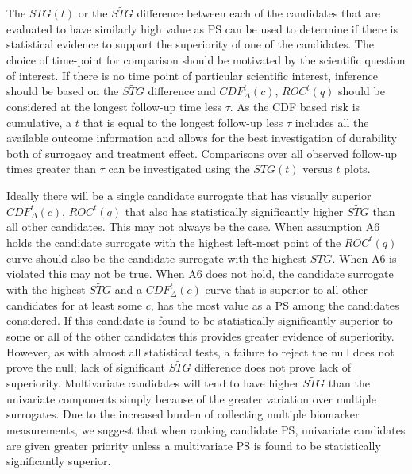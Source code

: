 \documentclass[times, doublespace]{simauth}
\begin{document}
The $STG(t)$ or the $\widetilde{STG}$ difference between each of the candidates that are evaluated to have similarly high value as PS can be used to determine if there is statistical evidence to support the superiority of one of the candidates. The choice of time-point for comparison should be motivated by the scientific question of interest. If there is no time point of particular scientific interest, inference should be based on the $\widetilde{STG}$ difference and $CDF^{t}_{\Delta}(c)$, $ROC^{t}(q)$ should be considered at the longest follow-up time less $\tau$. As the CDF based risk is cumulative, a $t$ that is equal to the longest follow-up less $\tau$ includes all the available outcome information and allows for the best investigation of durability both of surrogacy and treatment effect. Comparisons over all observed follow-up times greater than $\tau$ can be investigated using the $STG(t)$ versus $t$ plots.

Ideally there will be a single candidate surrogate that has visually superior $CDF^{t}_{\Delta}(c)$, $ROC^{t}(q)$ that also has statistically significantly higher $\widetilde{STG}$ than all other candidates. This may not always be the case. When assumption A6 holds the candidate surrogate with the highest left-most point of the $ROC^{t}(q)$ curve should also be the candidate surrogate with the highest $\widetilde{STG}$. When A6 is violated this may not be true. When A6 does not hold, the candidate surrogate with the highest $\widetilde{STG}$ and a $CDF^{t}_{\Delta}(c)$ curve that is superior to all other candidates for at least some $c$, has the most value as a PS among the candidates considered. If this candidate is found to be statistically significantly superior to some or all of the other candidates this provides greater evidence of superiority. However, as with almost all statistical tests, a failure to reject the null does not prove the null; lack of significant  $\widetilde{STG}$ difference does not prove lack of superiority. Multivariate candidates will tend to have higher $\widetilde{STG}$ than the univariate components simply because of the greater variation over multiple surrogates. Due to the increased burden of collecting multiple biomarker measurements, we suggest that when ranking candidate PS, univariate candidates are given greater priority unless a multivariate PS is found to be statistically significantly superior. 
\end{document}
